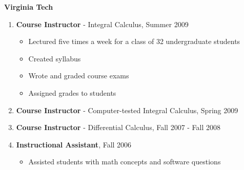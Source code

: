 \documentclass[10pt]{article}
\newenvironment{outerlist}[1][\enskip\textbullet]%
          {\begin{enumerate}[#1]}{\end{enumerate}%
           \vspace{-.6\baselineskip}}
\begin{document}
  \textbf{Virginia Tech}
  \begin{outerlist}
  \item[] 
  	\textbf{Course Instructor} - Integral Calculus, Summer 2009 
  	\begin{itemize}
  		 \item Lectured five times a week for a class of 32 undergraduate students
  		 \item Created syllabus
           \item Wrote and graded course exams
  		 \item Assigned grades to students
  	\end{itemize}
  \item[] 
  	\textbf{Course Instructor} - Computer-tested Integral
  	Calculus, Spring 2009 
  \item[] 
  	\textbf{Course Instructor} - Differential Calculus, Fall
  	2007 - Fall 2008
  \item[]
  	\textbf{Instructional Assistant}, Fall 2006 
  	\begin{itemize}
  		\item Assisted students with math concepts and software questions 
  	\end{itemize}
  \end{outerlist}
\end{document}
